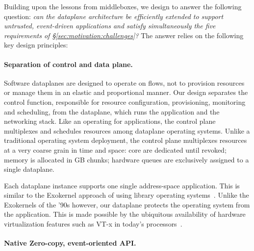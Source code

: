 
Building upon the lessons from middleboxes, we design \ix to answer
the following question: {\it can the dataplane architecture be
  efficiently extended to support untrusted, event-driven applications
  and satisfy simultaneously the five requirements of
  \S\ref{sec:motivation:challenges}?}  The answer relies on the
following key design principles:


\paragraph{Separation of control and data plane.}

Software dataplanes are designed to operate on flows, not to provision
resources or manage them in an elastic and proportional manner.  Our
design separates the control function, responsible for resource
configuration, provisioning, monitoring and scheduling, from the
dataplane, which runs the application and the networking stack.  Like
an operating for applications, the control plane multiplexes and
schedules resources among dataplane operating systems.  Unlike a traditional operating system
deployment, the control plane multiplexes resources at a very coarse
grain in time and space: core are dedicated until revoked; memory is
allocated in GB chunks; hardware queues are exclusively assigned to a
single dataplane.

Each dataplane instance supports one single address-space
application.  This is similar to the Exokernel approach of using
library operating systems~\cite{DBLP:conf/sosp/EnglerKO95}.  Unlike
the Exokernels of the '90s however, our dataplane protects the
operating system from the application.  This is made possible by the
ubiquitous availability of hardware virtualization features such as
VT-x in today's
processors~\cite{DBLP:journals/computer/UhligNRSMABKLS05}.


\paragraph{Native Zero-copy, event-oriented API.}

